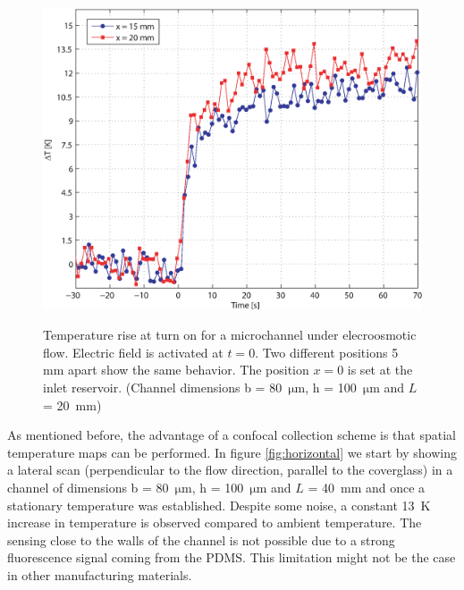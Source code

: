 \documentclass[twocolumn]{svjour3}       %
\begin{document}
\begin{figure}[h!]
\centering
\includegraphics[width=\columnwidth]{figs/temporal.eps}
\label{fig:temporal}
\caption{Temperature rise at turn on for a microchannel under elecroosmotic flow. Electric field is activated at $t=0$. Two different positions 5 mm apart show the same behavior. The position $x=0$ is set at the inlet reservoir. (Channel dimensions  b = 80~$\mathrm{\mu m}$, h = 100~$\mathrm{\mu m}$ and $L$ = 20~mm)}
\end{figure}

As mentioned before, the advantage of a confocal collection scheme is that spatial temperature maps can be performed. In figure \ref{fig:horizontal} we start by showing a lateral scan (perpendicular to the flow direction, parallel to the coverglass) in a channel of dimensions b = 80~$\mathrm{\mu m}$, h = 100~$\mathrm{\mu m}$ and $L$ = 40~mm and once a stationary temperature was established. Despite some noise, a constant 13~K increase in temperature is observed compared to ambient temperature. The sensing close to the walls of the channel is not possible due to a strong fluorescence signal coming from the PDMS. This limitation might not be the case in other manufacturing materials.
\end{document}
